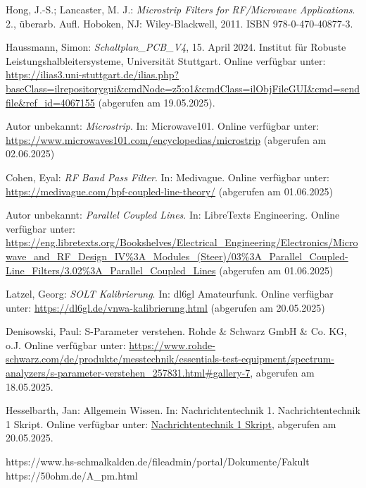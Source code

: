 \begin{thebibliography}{1}
Hong, J.-S.; Lancaster, M. J.: \emph{Microstrip Filters for RF/Microwave Applications}. 2., überarb. Aufl. Hoboken, NJ: Wiley-Blackwell, 2011. ISBN 978-0-470-40877-3.

Haussmann, Simon: \emph{Schaltplan\_PCB\_V4}, 15. April 2024. Institut für Robuste Leistungshalbleitersysteme, Universität Stuttgart. Online verfügbar unter: \url{https://ilias3.uni-stuttgart.de/ilias.php?baseClass=ilrepositorygui&cmdNode=z5:o1&cmdClass=ilObjFileGUI&cmd=sendfile&ref_id=4067155} (abgerufen am 19.05.2025).


Autor unbekannt: \emph{Microstrip}. In: Microwave101. Online verfügbar unter: \url{https://www.microwaves101.com/encyclopedias/microstrip} (abgerufen am 02.06.2025)


Cohen, Eyal: \emph{RF Band Pass Filter}. In: Medivague. Online verfügbar unter: \url{https://medivague.com/bpf-coupled-line-theory/} (abgerufen am 01.06.2025)


Autor unbekannt: \emph{Parallel Coupled Lines}. In: LibreTexts Engineering. Online verfügbar unter: \url{https://eng.libretexts.org/Bookshelves/Electrical_Engineering/Electronics/Microwave_and_RF_Design_IV%3A_Modules_(Steer)/03%3A_Parallel_Coupled-Line_Filters/3.02%3A_Parallel_Coupled_Lines} (abgerufen am 01.06.2025)


Latzel, Georg: \emph{SOLT Kalibrierung}. In: dl6gl Amateurfunk. Online verfügbar unter: \url{https://dl6gl.de/vnwa-kalibrierung.html} (abgerufen am 20.05.2025)
  
Denisowski, Paul: S-Parameter verstehen. Rohde \& Schwarz GmbH \& Co. KG, o.J. Online verfügbar unter: \url{https://www.rohde-schwarz.com/de/produkte/messtechnik/essentials-test-equipment/spectrum-analyzers/s-parameter-verstehen_257831.html#gallery-7}, abgerufen am 18.05.2025.

Hesselbarth, Jan: Allgemein Wissen. In: Nachrichtentechnik 1. Nachrichtentechnik 1 Skript. Online verfügbar unter: \url{Nachrichtentechnik 1 Skript}, abgerufen am 20.05.2025.




\end{thebibliography}

\clearpage

https://www.hs-schmalkalden.de/fileadmin/portal/Dokumente/Fakult%
https://50ohm.de/A_pm.html